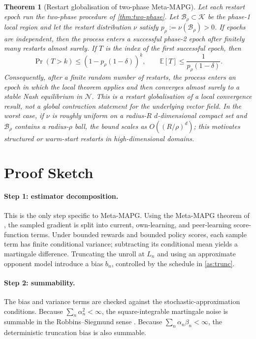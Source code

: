 \documentclass{article}
\theoremstyle{plain}
\newtheorem{theorem}{Theorem}[section]
\theoremstyle{definition}
\theoremstyle{remark}
\newcommand{\E}{\mathbb{E}}
\newcommand{\K}{\mathcal{K}}
\newcommand{\B}{\mathcal{B}}
\newcommand{\N}{\mathcal{N}}
\begin{document}
\begin{theorem}[Restart globalisation of two-phase Meta-MAPG]\label{thm:restart}
Let each restart epoch run the two-phase procedure of \cref{thm:two-phase}. Let $\B_\rho\subset\K$ be the phase-1 local region and let the restart distribution $\nu$ satisfy $p_\rho:=\nu(\B_\rho)>0$. If epochs are independent, then the process enters a successful phase-2 epoch after finitely many restarts almost surely. If $T$ is the index of the first successful epoch, then
\[
\Pr(T>k)\le (1-p_\rho(1-\delta))^k,\qquad
\E[T]\le \frac{1}{p_\rho(1-\delta)}.
\]
Consequently, after a finite random number of restarts, the process enters an epoch in which the local theorem applies and then converges almost surely to a stable Nash equilibrium in $\N$. This is a restart globalisation of a local convergence result, not a global contraction statement for the underlying vector field. In the worst case, if $\nu$ is roughly uniform on a radius-$R$ $d$-dimensional compact set and $\B_\rho$ contains a radius-$\rho$ ball, the bound scales as $O((R/\rho)^d)$; this motivates structured or warm-start restarts in high-dimensional domains.
\end{theorem}

\section{Proof Sketch}\label{sec:proof}

\paragraph{Step 1: estimator decomposition.}
This is the only step specific to Meta-MAPG. Using the Meta-MAPG theorem of \citet{kim2021meta}, the sampled gradient is split into current, own-learning, and peer-learning score-function terms. Under bounded rewards and bounded policy scores, each sample term has finite conditional variance; subtracting its conditional mean yields a martingale difference. Truncating the unroll at $L_n$ and using an approximate opponent model introduce a bias $b_n$, controlled by the schedule in \cref{as:trunc}.

\paragraph{Step 2: summability.}
The bias and variance terms are checked against the stochastic-approximation conditions. Because $\sum_n\alpha_n^2<\infty$, the square-integrable martingale noise is summable in the Robbins--Siegmund sense \citep{robbins1951stochastic,robbins1971convergence,hall1980martingale}. Because $\sum_n\alpha_n\beta_n<\infty$, the deterministic truncation bias is also summable.
\end{document}
